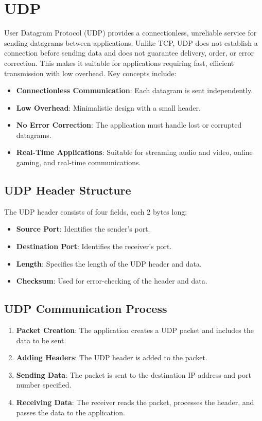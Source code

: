 \section{UDP}
User Datagram Protocol (UDP) provides a connectionless, unreliable service for sending datagrams between applications. Unlike TCP, UDP does not establish a connection before sending data and does not guarantee delivery, order, or error correction. This makes it suitable for applications requiring fast, efficient transmission with low overhead. Key concepts include:
\begin{itemize}
    \item \textbf{Connectionless Communication}: Each datagram is sent independently.
    \item \textbf{Low Overhead}: Minimalistic design with a small header.
    \item \textbf{No Error Correction}: The application must handle lost or corrupted datagrams.
    \item \textbf{Real-Time Applications}: Suitable for streaming audio and video, online gaming, and real-time communications.
\end{itemize}

\subsection{UDP Header Structure}
The UDP header consists of four fields, each 2 bytes long:
\begin{itemize}
    \item \textbf{Source Port}: Identifies the sender's port.
    \item \textbf{Destination Port}: Identifies the receiver's port.
    \item \textbf{Length}: Specifies the length of the UDP header and data.
    \item \textbf{Checksum}: Used for error-checking of the header and data.
\end{itemize}

\subsection{UDP Communication Process}
\begin{enumerate}
    \item \textbf{Packet Creation}: The application creates a UDP packet and includes the data to be sent.
    \item \textbf{Adding Headers}: The UDP header is added to the packet.
    \item \textbf{Sending Data}: The packet is sent to the destination IP address and port number specified.
    \item \textbf{Receiving Data}: The receiver reads the packet, processes the header, and passes the data to the application.
\end{enumerate}

